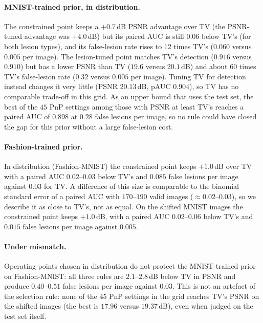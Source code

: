 \paragraph{MNIST-trained prior, in distribution.} The constrained point keeps a $+0.7$\,dB PSNR advantage over TV (the PSNR-tuned
advantage was $+4.0$\,dB) but its paired AUC is still $0.06$ below TV's (for both lesion types), and its false-lesion rate
rises to 12 times TV's ($0.060$ versus $0.005$ per image). The lesion-tuned point matches TV's detection ($0.916$ versus $0.910$) but has
a lower PSNR than TV ($19.6$ versus $20.1$\,dB) and about 60 times TV's false-lesion rate ($0.32$ versus $0.005$ per image). Tuning TV for
detection instead changes it very little (PSNR $20.13$\,dB, pAUC $0.904$), so TV has no comparable trade-off in this grid. As an upper bound
that uses the test set, the best of the $45$ PnP settings among those with PSNR at least TV's reaches a paired AUC of $0.898$ at $0.28$
false lesions per image, so no rule could have closed the gap for this prior without a large false-lesion cost.

\paragraph{Fashion-trained prior.} In distribution (Fashion-MNIST) the constrained point keeps $+1.0$\,dB over TV with a paired AUC
$0.02$--$0.03$ below TV's and $0.085$ false lesions per image against $0.03$ for TV. A difference of this size is comparable to the
binomial standard error of a paired AUC with $170$--$190$ valid images ($\approx0.02$--$0.03$), so we describe it as close to TV's, not as equal. On the shifted MNIST images the constrained point keeps $+1.0$\,dB, with a paired AUC $0.02$--$0.06$ below TV's and
$0.015$ false lesions per image against $0.005$.

\paragraph{Under mismatch.} Operating points chosen in distribution do not protect the MNIST-trained prior on Fashion-MNIST: all
three rules are $2.1$--$2.8$\,dB below TV in PSNR and produce $0.40$--$0.51$ false lesions per image against $0.03$. This is not an
artefact of the selection rule: none of the $45$ PnP settings in the grid reaches TV's PSNR on the shifted images (the best is $17.96$
versus $19.37$\,dB), even when judged on the test set itself.

